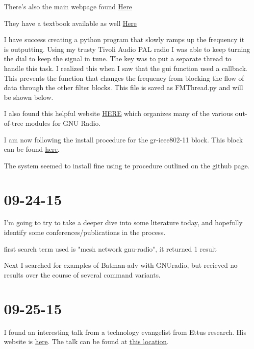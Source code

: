 \documentclass{article}
\begin{document}
	There's also the main webpage found \href{http://ecewp.ece.wpi.edu/wordpress/wireless/files/}{Here}

	They have a textbook available as well \href{http://www.qsl.net/yo4tnv/docs/Cognitive\%20Radio\%20Communications\%20and\%20Networks\%20-\%20A.\%20Wyglinski,\%20et\%20al.,\%20\%28AP,\%202010\%29\%20WW.pdf}{Here}

	I have success creating a python program that slowly ramps up the frequency it is outputting. Using my trusty Tivoli Audio PAL radio I was able to keep
	turning the dial to keep the signal in tune. The key was to put a separate thread to handle this task. I realized this when I saw that the gui function
	used a callback. This prevents the function that changes the frequency from blocking the flow of data through the other filter blocks. 
	This file is saved as FMThread.py and will be shown below. 
	
	\lstset{tabsize=2, caption=dial\_tone.py,}
        

	I also found this helpful website \href{http://www.cgran.org/index.html}{HERE} which organizes many of the various out-of-tree modules for GNU Radio.
	
	I am now following the install procedure for the gr-ieee802-11 block. 
	This block can be found \href{https://github.com/bastibl/gr-ieee802-11}{here}.

	The system seemed to install fine using te procedure outlined on the github page.

	\section{09-24-15}
	
	I'm going to try to take a deeper dive into some literature today, and hopefully identify some conferences/publications in the process. 
	
	first search term used is "mesh network gnu-radio", it returned 1 result

	Next I searched for examples of Batman-adv with GNUradio, but recieved no results over the course of several command variants.
	
	\section{09-25-15}

	I found an interesting talk from a technology evangelist from Ettus research. His website is \href{http://spench.net/drupal/}{here}. The talk
	can be found at \href{https://www.youtube.com/watch?v=ZuNOD3XWp4A}{this location}.
\end{document}
